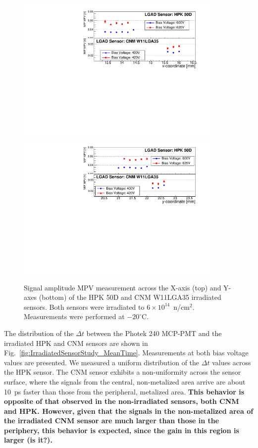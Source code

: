 \documentclass[preprint,1p]{elsarticle}
\begin{document}
\begin{figure}[htbp] 
\centering
\includegraphics[width=0.90\textwidth]{figs/USCSBoard_HPK50DIrradiated-CNMW11LGA35_Run936-961/IrradiatedSensorStudy_MPV_vs_X.pdf} 
\includegraphics[width=0.90\textwidth]{figs/USCSBoard_HPK50DIrradiated-CNMW11LGA35_Run936-961/IrradiatedSensorStudy_MPV_vs_Y.pdf} 
\caption{Signal amplitude MPV measurement across the X-axis (top) and Y-axes (bottom) of the HPK 50D and CNM W11LGA35 irradiated sensors. Both sensors were irradiated to $6\times 10^{14}$~n/cm$^2$. Measurements were performed at $-20^{\circ}$C.} 
\label{fig:IrradiatedSensorStudy_MPV} 
\end{figure}

The distribution of the $\Delta{t}$ between the Photek 240 MCP-PMT and the
irradiated HPK and CNM sensors are shown in
Fig.~\ref{fig:IrradiatedSensorStudy_MeanTime}. Measurements at both bias voltage
values are presented. We measured a uniform distribution of the $\Delta{t}$
values across the HPK sensor. The CNM sensor exhibits a non-uniformity across
the sensor surface, where the signals from the central, non-metalized area
arrive are about 10~ps faster than those from the peripheral, metalized area.
\textbf {This behavior is opposite of that observed in the non-irradiated
sensors, both CNM and HPK. However, given that the signals in the non-metalized
area of the irradiated CNM sensor are much larger than those in the periphery,
this behavior is expected, since the gain in this region is larger (is it?).}
\end{document}

